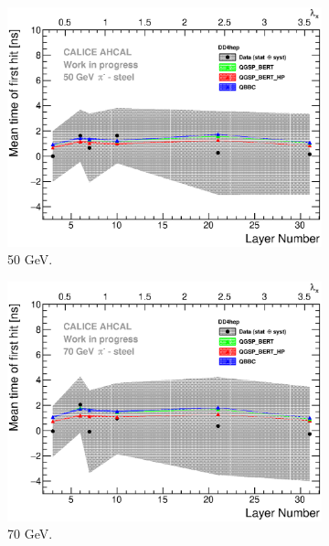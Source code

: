 \begin{figure}[htbp!]
  \hfill
  \begin{subfigure}[t]{0.49\textwidth}
    \centering
    \includegraphics[width=1\textwidth]{../Thesis_Plots/Timing/Pions/Plots/ComparisonToSim/Time_Depth_50GeV_DD4hep.eps}
    \caption{50 GeV.} \label{fig:Depth_SimData_50GeV_DD4hep}
  \end{subfigure}
  \hfill
  \begin{subfigure}[t]{0.49\textwidth}
    \centering
    \includegraphics[width=1\textwidth]{../Thesis_Plots/Timing/Pions/Plots/ComparisonToSim/Time_Depth_70GeV_DD4hep.eps}
    \caption{70 GeV.} \label{fig:Depth_SimData_70GeV_DD4hep}
  \end{subfigure}
  \hfill
  \begin{subfigure}[t]{0.49\textwidth}

\end{subfigure}
\end{figure}
